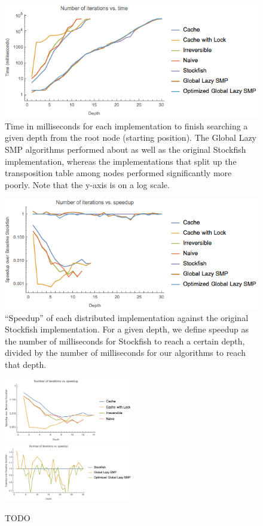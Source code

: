 \documentclass{article}
\begin{document}
\begin{figure}
	\includegraphics[width=\textwidth]{../plots/timetodepth}
	\caption{Time in milliseconds for each implementation to finish
	searching a given depth from the root node (starting position). The
	Global Lazy SMP algorithms performed about as well as the original
	Stockfish implementation, whereas the implementations that split up the
	transposition table among nodes performed significantly more poorly.
	Note that the y-axis is on a log scale.}
	\label{fig:ttd}
\end{figure}

\begin{figure}
	\includegraphics[width=\textwidth]{../plots/speedup}
	\caption{``Speedup'' of each distributed implementation against the
	original Stockfish implementation. For a given depth, we define speedup
	as the number of milliseconds for Stockfish to reach a certain depth,
	divided by the number of milliseconds for our algorithms to reach that
	depth.}
	\label{fig:speedup}
\end{figure}

\begin{figure}
	\includegraphics[width=0.5\textwidth]{../plots/speedup_bad}
	\includegraphics[width=0.5\textwidth]{../plots/speedup_good}
	\caption{TODO}
	\label{fig:speedup-separate}
\end{figure}
\end{document}
